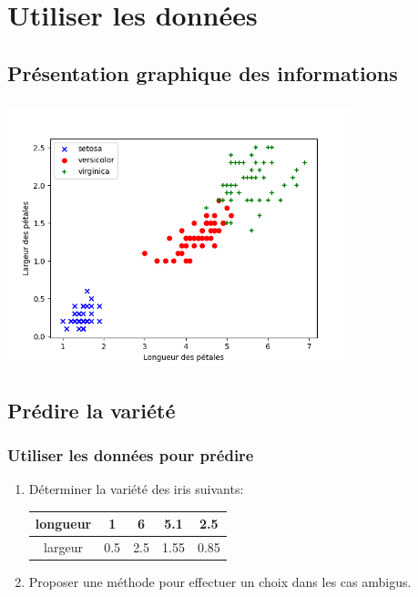 \documentclass[svgnames,11pt]{beamer}
\begin{document}
\section{Utiliser les données}
\subsection{Présentation graphique des informations}
\begin{frame}
    \frametitle{}

\begin{center}
\centering
\includegraphics[width=10cm]{ressources/iris-graphe.png}
\label{graphe-iris}
\end{center}

\end{frame}

\subsection{Prédire la variété}
\begin{frame}
    \frametitle{Utiliser les données pour prédire}

\begin{activite}
\begin{enumerate}
    \item Déterminer la variété des iris suivants:
    \begin{tabular}{|*{5}{c|}}
        \hline
        longueur&1&6 &5.1 &2.5 \\
        \hline
        largeur&0.5&2.5& 1.55&0.85 \\
        \hline
    \end{tabular}
    \item Proposer une méthode pour effectuer un choix dans les cas ambigus.
\end{enumerate}
\end{activite}

\end{frame}
\end{document}
